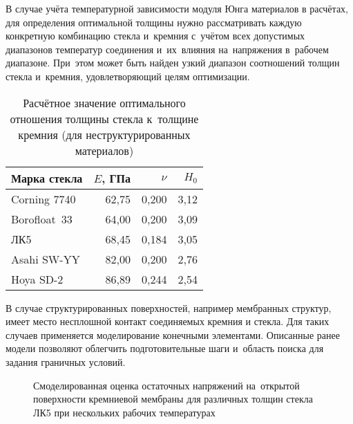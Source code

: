 \begingroup
В случае учёта температурной зависимости модуля Юнга материалов в расчётах,
для
определения оптимальной толщины нужно рассматривать каждую конкретную
комбинацию стекла и~кремния с~учётом всех допустимых диапазонов
температур соединения и~их~влияния на~напряжения в~рабочем диапазоне.
При~этом может быть найден узкий диапазон соотношений толщин стекла
и~кремния, удовлетворяющий целям оптимизации.\russianpar
\endgroup

\setlength\intextsep{0em}%
\begin{wraptable}[12]{O}{0.50\textwidth}
	\caption{Расчётное значение оптимального отношения толщины
	стекла к~толщине кремния
	(для неструктурированных материалов)}%
    \label{tab_h0_stekla}
    \begin{tabularx}{\linewidth}{@{}Xrrr@{}}
        \toprule     %
        Марка стекла & $E$, ГПа &  $ \nu $ & $ H_0 $ \\
        \midrule %
        Corning 7740 & 62,75 & 0,200 & 3,12 \\
        Borofloat~33 & 64,00 & 0,200 & 3,09\\
        ЛК5 & 68,45 & 0,184 & 3,05\\
        Asahi SW-YY & 82,00 & 0,200 & 2,76\\
        Hoya SD-2 & 86,89 & 0,244 & 2,54\\
        \bottomrule %
    \end{tabularx}
\end{wraptable}

В случае структурированных поверхностей, например мембранных структур,
имеет место несплошной контакт соединяемых кремния и стекла. Для таких
случаев применяется моделирование конечными элементами.
Описанные ранее модели позволяют облегчить подготовительные шаги
и~область поиска для задания граничных условий.

\setlength\intextsep{0em}%
\begin{wrapfigure}[21]{O}{0.5\textwidth}
    \caption{Смоделированная оценка остаточных напряжений на~открытой
    поверхности кремниевой мембраны для различных толщин стекла ЛК5 при нескольких
    рабочих температурах}%
    \label{fig:si_membrane_third_inv_stress}
\end{wrapfigure}

